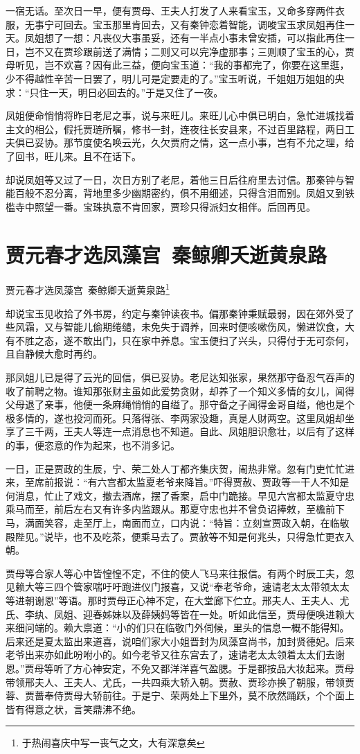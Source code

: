 \documentclass[12pt,oneside]{book}
\begin{document}
一宿无话。至次日一早，便有贾母、王夫人打发了人来看宝玉，又命多穿两件衣服，无事宁可回去。宝玉那里肯回去，又有秦钟恋着智能，调唆宝玉求凤姐再住一天。凤姐想了一想：凡丧仪大事虽妥，还有一半点小事未曾安插，可以指此再住一日，岂不又在贾珍跟前送了满情；二则又可以完净虚那事；三则顺了宝玉的心，贾母听见，岂不欢喜？因有此三益，便向宝玉道：“我的事都完了，你要在这里逛，少不得越性辛苦一日罢了，明儿可是定要走的了。”宝玉听说，千姐姐万姐姐的央求：“只住一天，明日必回去的。”于是又住了一夜。

凤姐便命悄悄将昨日老尼之事，说与来旺儿。来旺儿心中俱已明白，急忙进城找着主文的相公，假托贾琏所嘱，修书一封，连夜往长安县来，不过百里路程，两日工夫俱已妥协。那节度使名唤云光，久欠贾府之情，这一点小事，岂有不允之理，给了回书，旺儿来。且不在话下。

却说凤姐等又过了一日，次日方别了老尼，着他三日后往府里去讨信。那秦钟与智能百般不忍分离，背地里多少幽期密约，俱不用细述，只得含泪而别。凤姐又到铁槛寺中照望一番。宝珠执意不肯回家，贾珍只得派妇女相伴。后回再见。

 
\chapter{贾元春才选凤藻宫~秦鲸卿夭逝黄泉路}
贾元春才选凤藻宫~秦鲸卿夭逝黄泉路\footnote{于热闹喜庆中写一丧气之文，大有深意矣}

却说宝玉见收拾了外书房，约定与秦钟读夜书。偏那秦钟秉赋最弱，因在郊外受了些风霜，又与智能儿偷期绻缱，未免失于调养，回来时便咳嗽伤风，懒进饮食，大有不胜之态，遂不敢出门，只在家中养息。宝玉便扫了兴头，只得付于无可奈何，且自静候大愈时再约。

那凤姐儿已是得了云光的回信，俱已妥协。老尼达知张家，果然那守备忍气吞声的收了前聘之物。谁知那张财主虽如此爱势贪财，却养了一个知义多情的女儿，闻得父母退了亲事，他便一条麻绳悄悄的自缢了。那守备之子闻得金哥自缢，他也是个极多情的，遂也投河而死。只落得张、李两家没趣，真是人财两空。这里凤姐却坐享了三千两，王夫人等连一点消息也不知道。自此、凤姐胆识愈壮，以后有了这样的事，便恣意的作为起来，也不消多记。

一日，正是贾政的生辰，宁、荣二处人丁都齐集庆贺，闹热非常。忽有门吏忙忙进来，至席前报说：“有六宫都太监夏老爷来降旨。”吓得贾赦、贾政等一干人不知是何消息，忙止了戏文，撤去酒席，摆了香案，启中门跪接。早见六宫都太监夏守忠乘马而至，前后左右又有许多内监跟从。那夏守忠也并不曾负诏捧敕，至檐前下马，满面笑容，走至厅上，南面而立，口内说：“特旨：立刻宣贾政入朝，在临敬殿陛见。”说毕，也不及吃茶，便乘马去了。贾赦等不知是何兆头，只得急忙更衣入朝。

贾母等合家人等心中皆惶惶不定，不住的使人飞马来往报信。有两个时辰工夫，忽见赖大等三四个管家喘吁吁跑进仪门报喜，又说“奉老爷命，速请老太太带领太太等进朝谢恩”等语。那时贾母正心神不定，在大堂廊下伫立。邢夫人、王夫人、尤氏、李纨、凤姐、迎春姊妹以及薛姨妈等皆在一处。听如此信至，贾母便唤进赖大来细问端的。赖大禀道：“小的们只在临敬门外伺候，里头的信息一概不能得知。后来还是夏太监出来道喜，说咱们家大小姐晋封为凤藻宫尚书，加封贤德妃。后来老爷出来亦如此吩咐小的。如今老爷又往东宫去了，速请老太太领着太太们去谢恩。”贾母等听了方心神安定，不免又都洋洋喜气盈腮。于是都按品大妆起来。贾母带领邢夫人、王夫人、尤氏，一共四乘大轿入朝。贾赦、贾珍亦换了朝服，带领贾蓉、贾蔷奉侍贾母大轿前往。于是宁、荣两处上下里外，莫不欣然踊跃，个个面上皆有得意之状，言笑鼎沸不绝。
\end{document}
